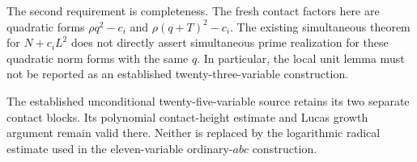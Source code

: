 \documentclass[11pt]{article}
\begin{document}
The second requirement is completeness. The fresh contact factors here
are quadratic forms $\rho q^2-c_i$ and
$\rho(q+T)^2-c_i$. The existing simultaneous theorem for
$N+c_iL^2$ does not directly assert simultaneous prime realization
for these quadratic norm forms with the same $q$. In particular,
the local unit lemma must not be reported as an established
twenty-three-variable construction.

The established unconditional twenty-five-variable source retains its
two separate contact blocks. Its polynomial contact-height estimate
and Lucas growth argument remain valid there. Neither is replaced by
the logarithmic radical estimate used in the eleven-variable
ordinary-$abc$ construction.
\end{document}
